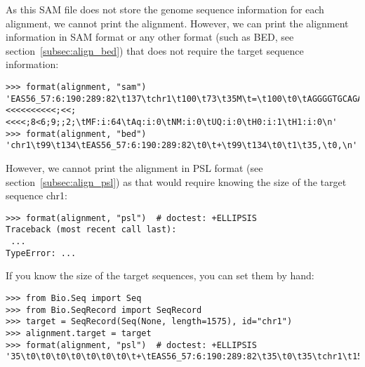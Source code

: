 As this SAM file does not store the genome sequence information for each alignment, we cannot print the alignment. However, we can print the alignment information in SAM format or any other format (such as BED, see section~\ref{subsec:align_bed}) that does not require the target sequence information:
\begin{verbatim}
>>> format(alignment, "sam")
'EAS56_57:6:190:289:82\t137\tchr1\t100\t73\t35M\t=\t100\t0\tAGGGGTGCAGAGCCGAGTCACGGGGTTGCCAGCAC\t<<<<<<;<<<<<<<<<<;<<;<<<<;8<6;9;;2;\tMF:i:64\tAq:i:0\tNM:i:0\tUQ:i:0\tH0:i:1\tH1:i:0\n'
>>> format(alignment, "bed")
'chr1\t99\t134\tEAS56_57:6:190:289:82\t0\t+\t99\t134\t0\t1\t35,\t0,\n'
\end{verbatim}
However, we cannot print the alignment in PSL format (see section~\ref{subsec:align_psl}) as that would require knowing the size of the target sequence chr1:
\begin{verbatim}
>>> format(alignment, "psl")  # doctest: +ELLIPSIS
Traceback (most recent call last):
 ...
TypeError: ...
\end{verbatim}
If you know the size of the target sequences, you can set them by hand:
\begin{verbatim}
>>> from Bio.Seq import Seq
>>> from Bio.SeqRecord import SeqRecord
>>> target = SeqRecord(Seq(None, length=1575), id="chr1")
>>> alignment.target = target
>>> format(alignment, "psl")  # doctest: +ELLIPSIS
'35\t0\t0\t0\t0\t0\t0\t0\t+\tEAS56_57:6:190:289:82\t35\t0\t35\tchr1\t1575\t99\t134\t1\t35,\t0,\t99,\n'
\end{verbatim}

